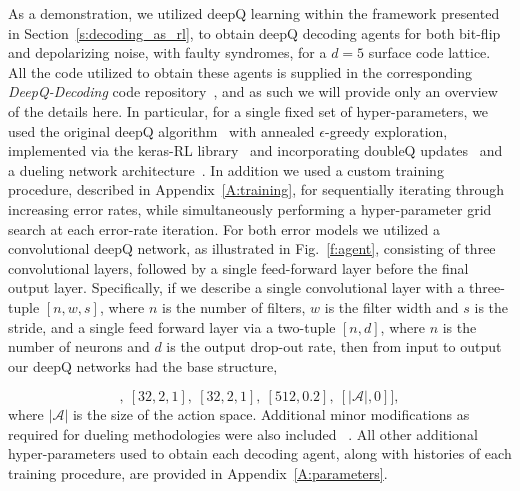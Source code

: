 \documentclass[twocolumn,preprintnumbers,amsmath,amssymb,notitlepage,nofootinbib,longbibliography,superscriptaddress,aps,pra,10pt]{revtex4-1}
\begin{document}
	As a demonstration, we utilized deepQ learning within the framework presented in Section~\ref{s:decoding_as_rl}, to obtain deepQ decoding agents for both bit-flip and depolarizing noise, with faulty syndromes, for a $d=5$ surface code lattice.
	All the code utilized to obtain these agents is supplied in the corresponding \textit{DeepQ-Decoding} code repository~\cite{DeepQDecoding}, and as such we will provide only an overview of the details here.
	In particular, for a single fixed set of hyper-parameters, we used the original deepQ algorithm~\cite{RLMnih15} with annealed $\epsilon$-greedy exploration, implemented via the keras-RL library~\cite{plappert2016kerasrl} and incorporating doubleQ updates~\cite{RLvan2016deep} and a dueling network architecture~\cite{RLwang2015dueling}.
	In addition we used a custom training procedure, described in Appendix~\ref{A:training}, for sequentially iterating through increasing error rates, while simultaneously performing a hyper-parameter grid search at each error-rate iteration.
	For both error models we utilized a convolutional deepQ network, as illustrated in Fig.~\ref{f:agent}, consisting of three convolutional layers, followed by a single feed-forward layer before the final output layer.
	Specifically, if we describe a single convolutional layer with a three-tuple $[n,w,s]$, where $n$ is the number of filters, $w$ is the filter width and $s$ is the stride, and a single feed forward layer via a two-tuple $[n,d]$, where $n$ is the number of neurons and $d$ is the output drop-out rate, then from input to output our deepQ networks had the base structure,


	\begin{equation}
		[[64,3,2],~[32,2,1],~[32,2,1],~[512,0.2],~[|\mathcal{A}|, 0]],
	\end{equation}
	where $|\mathcal{A}|$ is the size of the action space.
	Additional minor modifications as required for dueling methodologies were also included~\cite{RLwang2015dueling} .
	All other additional hyper-parameters used to obtain each decoding agent, along with histories of each training procedure, are provided in Appendix~\ref{A:parameters}.
\end{document}
